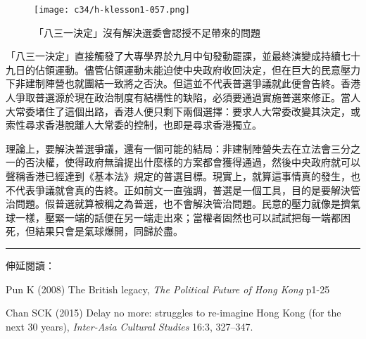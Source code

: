 \begin{figure}[htbp]
    \centering
    \texttt{[image: c34/h-klesson1-057.png]}
    \caption{「八三一決定」沒有解決選委會認授不足帶來的問題}
\end{figure}

「八三一決定」直接觸發了大專學界於九月中旬發動罷課，並最終演變成持續七十九日的佔領運動。儘管佔領運動未能迫使中央政府收回決定，但在巨大的民意壓力下非建制陣營也就團結一致將之否決。但這並不代表普選爭議就此便會告終。香港人爭取普選源於現在政治制度有結構性的缺陷，必須要通過實施普選來修正。當人大常委堵住了這個出路，香港人便只剩下兩個選擇：要求人大常委改變其決定，或索性尋求香港脫離人大常委的控制，也即是尋求香港獨立。

理論上，要解決普選爭議，還有一個可能的結局：非建制陣營失去在立法會三分之一的否決權，使得政府無論提出什麼樣的方案都會獲得通過，然後中央政府就可以聲稱香港已經達到《基本法》規定的普選目標。現實上，就算這事情真的發生，也不代表爭議就會真的告終。正如前文一直強調，普選是一個工具，目的是要解決管治問題。假普選就算被稱之為普選，也不會解決管治問題。民意的壓力就像是擠氣球一樣，壓緊一端的話便在另一端走出來；當權者固然也可以試試把每一端都困死，但結果只會是氣球爆開，同歸於盡。

\rule[-10pt]{15cm}{0.05em}

伸延閱讀：

Pun K (2008) The British legacy, \textit{The Political Future of Hong Kong} p1-25

Chan SCK (2015) Delay no more: struggles to re-imagine Hong Kong (for the next 30 years), \textit{Inter-Asia Cultural Studies} 16:3, 327–347.